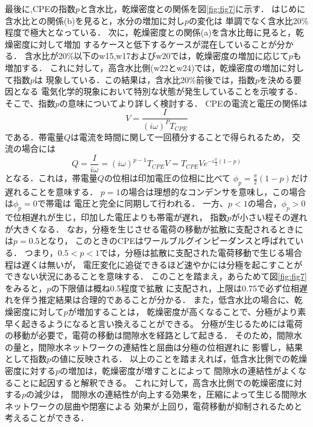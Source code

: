 \documentclass{jsce}
\begin{document}
最後に,CPEの指数$p$と含水比，乾燥密度との関係を図\ref{fig:fig7}に示す．
はじめに含水比との関係(b)を見ると，水分の増加に対し$p$の変化は
単調でなく含水比20\%程度で極大となっている．
次に，乾燥密度との関係(a)を含水比毎に見ると，乾燥密度に対して増加
するケースと低下するケースが混在していることが分かる．
含水比が20\%以下のw15,w17およびw20では，乾燥密度の増加に応じて$p$も増加する．
これに対して，高含水比側(w22とw24)では，乾燥密度の増加に対して指数$p$は
現象している．この結果は，含水比20\%前後では，指数$p$を決める要因となる
電気化学的現象において特別な状態が発生していることを示唆する．
そこで、指数$p$の意味についてより詳しく検討する．
CPEの電流と電圧の関係は
\begin{equation}
	V=\frac{I}{(i\omega )^PT_{CPE}}
	\label{eqn:}
\end{equation}
である．帯電量$Q$は電流を時間に関して一回積分することで得られるため，
交流の場合には
\begin{equation}
	Q=\frac{I}{i \omega}=(i\omega)^{p-1}T_{CPE}V=T_{CPE}Ve^{-i\frac{\pi}{2}(1-p)}
	\label{eqn:}
\end{equation}
となる．これは，帯電量$Q$の位相は印加電圧の位相に比べて
$\phi_p=\frac{\pi}{2}(1-p)$だけ遅れることを意味する．
$p=1$の場合は理想的なコンデンサを意味し，この場合は$\phi_p=0$で帯電は
電圧と完全に同期して行われる．
一方、$p<1$の場合，$\phi_p>0$で位相遅れが生じ，印加した電圧よりも帯電が遅れ，
指数$p$が小さい程その遅れが大きくなる．
なお，分極を生じさせる電荷の移動が拡散に支配されるときには$p=0.5$となり，
このときのCPEはワールブルグインピーダンスと呼ばれている．
つまり，$0.5<p<1$では，分極は拡散に支配された電荷移動で生じる場合程は遅くは無いが，
電圧変化に追従できるほど速やかには分極を起こすことができない状況にあることを意味する．
このことを踏まえ，あらためて図\ref{fig:fig7}をみると，$p$の下限値は概ね0.5程度で拡散
に支配され，上限は0.75で必ず位相遅れを伴う推定結果は合理的であることが分かる．
また，低含水比の場合に、乾燥密度に対して$p$が増加することは，
乾燥密度が高くなることで、分極がより素早く起きるようになると言い換えることができる。
分極が生じるためには電荷の移動が必要で，電荷の移動は間隙水を経路として起きる．
そのため，間隙水の量と，間隙水ネットワークの連結性と屈曲は分極の位相遅れに
影響し，結果として指数$p$の値に反映される．
以上のことを踏まえれば，低含水比側での乾燥密度に対する$p$の増加は，乾燥密度が増すことによって
間隙水の連結性がよくなることに起因すると解釈できる。
これに対して，高含水比側での乾燥密度に対する$p$の減少は，
間隙水の連結性が向上する効果を，圧縮によって生じる間隙水ネットワークの屈曲や閉塞による
効果が上回り，電荷移動が抑制されるためと考えることができる．
\end{document}
